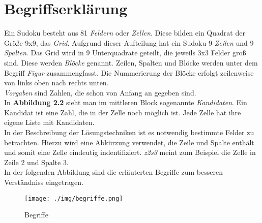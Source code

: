 \section{Begriffserklärung}
Ein Sudoku besteht aus 81 \textit{Feldern} oder \textit{Zellen}. Diese bilden ein Quadrat der Größe 9x9, das \textit{Grid}. Aufgrund dieser Aufteilung hat ein Sudoku 9 \textit{Zeilen} und 9 \textit{Spalten}. Das Grid wird in 9 Unterquadrate geteilt, die jeweils 3x3 Felder groß sind. Diese werden \textit{Blöcke} genannt. Zeilen, Spalten und Blöcke werden unter dem Begriff \textit{Figur} zusammengfasst. Die Nummerierung der Blöcke erfolgt zeilenweise von links oben nach rechts unten.\\
\textit{Vorgaben} sind Zahlen, die schon von Anfang an gegeben sind.\\
In \textbf{Abbildung 2.2} sieht man im mittleren Block sogenannte \textit{Kandidaten}. Ein Kandidat ist eine Zahl, die in der Zelle noch möglich ist. Jede Zelle hat ihre eigene Liste mit Kandidaten.\\
In der Beschreibung der Lösungstechniken ist es notwendig bestimmte Felder zu betrachten. Hierzu wird eine Abkürzung verwendet, die Zeile und Spalte enthält und somit eine Zelle eindeutig indentifiziert. \textit{z2s3} meint zum Beispiel die Zelle in Zeile 2 und Spalte 3.\\
In der folgenden Abbildung sind die erläuterten Begriffe zum besseren Verständniss eingetragen.\\

\begin{figure}[h]
\begin{center}
\texttt{[image: ./img/begriffe.png]}
\caption{Begriffe}
\end{center}
\end{figure}